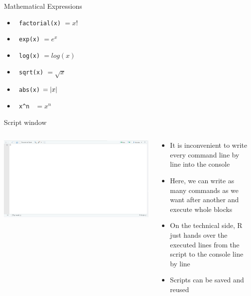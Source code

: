 \documentclass[xcolor=dvipsnames, aspectratio = 169]{beamer}
\begin{document}
\begin{frame}[fragile]{Mathematical Expressions}
	\begin{itemize}
		\item \verb+ factorial(x)+ $= x!$
		\item \verb+ exp(x)+ $=e^x$
		\item \verb+ log(x)+ $=log(x)$
		\item \verb+ sqrt(x)+ $=\sqrt{x}$
		\item \verb+ abs(x)+ $=\left\lvert x \right\rvert$
		\item \verb+ x^n + $=x^n$
	\end{itemize}
\end{frame}

\begin{frame}{Script window}
	\begin{columns}[T]
	\begin{column}{0.6\textwidth}
	\includegraphics[width=\textwidth]{Rstudio_interface_i}
	\end{column}
	\begin{column}{0.4\textwidth}
	\begin{itemize}
		\item \small It is inconvenient to write every command line by line into the console
		\item \small Here, we can write as many commands as we want after another and execute whole blocks
		\item \small On the technical side, R just hands over the executed lines from the script to the console line by line
		\item \small Scripts can be saved and reused
	\end{itemize}
	\end{column}
\end{columns}
\end{frame}
\end{document}
